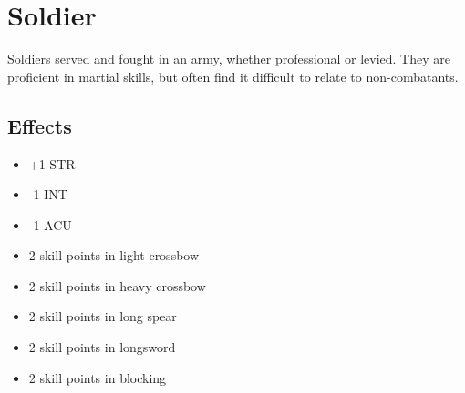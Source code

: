 \section{Soldier}\label{background:soldier}
Soldiers served and fought in an army, whether professional or levied. They
are proficient in martial skills, but often find it difficult to relate to
non-combatants.

\subsection{Effects}
\begin{itemize}
    \item +1 STR
    \item -1 INT
    \item -1 ACU
    \item 2 skill points in light crossbow
    \item 2 skill points in heavy crossbow
    \item 2 skill points in long spear
    \item 2 skill points in longsword
    \item 2 skill points in blocking
\end{itemize}
